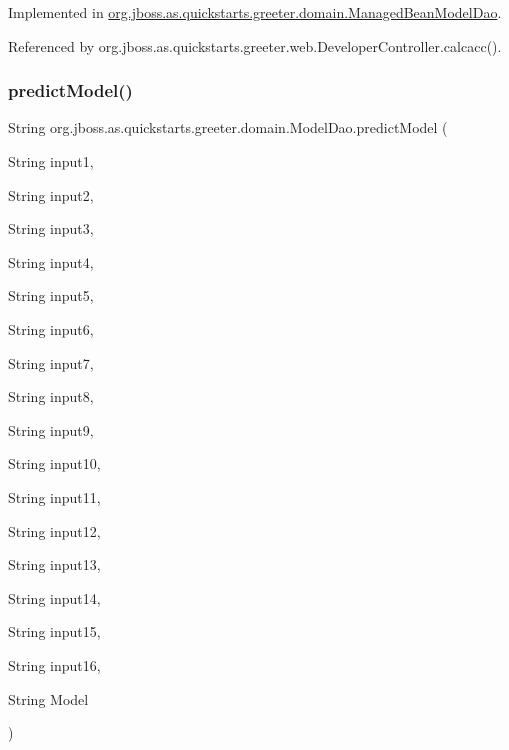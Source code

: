 Implemented in \hyperlink{classorg_1_1jboss_1_1as_1_1quickstarts_1_1greeter_1_1domain_1_1_managed_bean_model_dao_ab92b0e5250b87e53aedff8796054c433}{org.\+jboss.\+as.\+quickstarts.\+greeter.\+domain.\+Managed\+Bean\+Model\+Dao}.



Referenced by org.\+jboss.\+as.\+quickstarts.\+greeter.\+web.\+Developer\+Controller.\+calcacc().

\mbox{\label{interfaceorg_1_1jboss_1_1as_1_1quickstarts_1_1greeter_1_1domain_1_1_model_dao_ac57ecc08e389fcc50bd26a3fbe579de3}} 
\subsubsection{\texorpdfstring{predict\+Model()}{predictModel()}}
{\footnotesize\ttfamily String org.\+jboss.\+as.\+quickstarts.\+greeter.\+domain.\+Model\+Dao.\+predict\+Model (\begin{DoxyParamCaption}\item[{String}]{input1,  }\item[{String}]{input2,  }\item[{String}]{input3,  }\item[{String}]{input4,  }\item[{String}]{input5,  }\item[{String}]{input6,  }\item[{String}]{input7,  }\item[{String}]{input8,  }\item[{String}]{input9,  }\item[{String}]{input10,  }\item[{String}]{input11,  }\item[{String}]{input12,  }\item[{String}]{input13,  }\item[{String}]{input14,  }\item[{String}]{input15,  }\item[{String}]{input16,  }\item[{String}]{Model }\end{DoxyParamCaption})}



